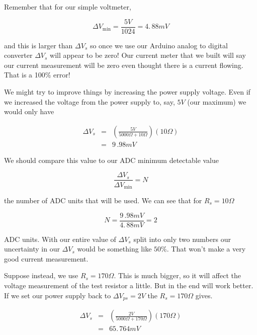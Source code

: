 \noindent Remember that for our simple voltmeter, 

\begin{equation*}
	\Delta V_{\min }=\frac{5\unit{V}}{1024}=4.\,\allowbreak 88\unit{mV}
\end{equation*}

\noindent and this is larger than $\Delta V_{s}$ so once we use our Arduino analog to digital converter $\Delta V_{s}$ will appear to be zero! Our current meter that we built will say our current measurement will be zero even thought there is a current flowing. That is a 100\% error!

We might try to improve things by increasing the power supply voltage. Even
if we increased the voltage from the power supply to, say, $5\unit{V}$ (our
maximum) we would only have 

\begin{eqnarray*}
	\Delta V_{s}   &=&\left(\frac{5\unit{V}}{5000\unit{\Omega}+10\unit{\Omega}}\right) \left( 10\unit{\Omega}\right) \\
    &=&9\,.98\unit{mV}
\end{eqnarray*}

We should compare this value to our ADC minimum detectable value 

\begin{equation*}
	\frac{\Delta V_{s}}{\Delta V_{\min }}=N
\end{equation*}

\noindent the number of ADC units that will be used. We can see that for $R_{s}=10\unit{\Omega}$ 

\begin{equation*}
	N=\frac{9\,.98\unit{mV}}{4.\,\allowbreak 88\unit{mV}}=2
\end{equation*}

\noindent ADC units. With our entire value of $\Delta V_{s}$ split into only two numbers our uncertainty in our $\Delta V_{s}$ would be something like $50\%.$ That won't make a very good current measurement.

Suppose instead, we use $R_{s}=170\unit{\Omega}.$  This is much bigger, so it will affect the voltage measurement of the test resistor a little. But in the end will work better. If we set our power supply back to $\Delta V_{ps}=2\unit{V}$ the $R_{s}=170\unit{\Omega}$ gives. 

\begin{eqnarray*}
	\Delta V_{s} &=&\left( \frac{2\unit{V}}{5000\unit{\Omega}+170\unit{\Omega}}\right) \left( 170\unit{\Omega}\right) \\
                 &=&65.\,\allowbreak 764\unit{mV}
\end{eqnarray*}

